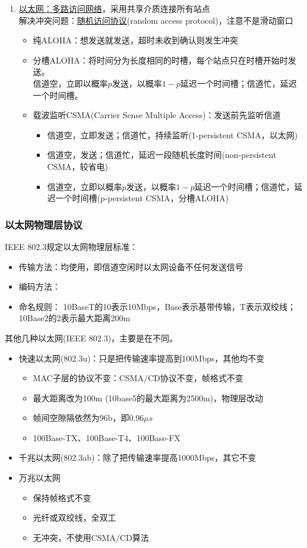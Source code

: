 \begin{enumerate}
\item \underline{以太网：多路访问网络}，采用共享介质连接所有站点\\
解决冲突问题：\underline{随机访问协议}(random access protocol)，注意不是滑动窗口
\begin{itemize}
\item 纯ALOHA：想发送就发送，超时未收到确认则发生冲突
\item 分槽ALOHA：将时间分为长度相同的时槽，每个站点只在时槽开始时发送。\\
信道空，立即以概率$p$发送，以概率$1-p$延迟一个时间槽；信道忙，延迟一个时间槽。
\item 载波监听CSMA(Carrier Sense Multiple Access)：发送前先监听信道
\begin{itemize}
	\item 信道空，立即发送；信道忙，持续监听(1-persistent CSMA，以太网)
	\item 信道空，发送；信道忙，延迟一段随机长度时间(non-persistent CSMA，较省电)
	\item 信道空，立即以概率$p$发送，以概率$1-p$延迟一个时间槽；信道忙，延迟一个时间槽(p-persistent CSMA，分槽ALOHA)
\end{itemize}
\end{itemize}
\end{enumerate}

\subsubsection{以太网物理层协议}
IEEE 802.3规定以太网物理层标准：
\begin{itemize}
	\item 传输方法：均使用，即信道空闲时以太网设备不任何发送信号
	\item 编码方法：
	\item 命名规则： 10BaseT的10表示10Mbps，Base表示基带传输，T表示双绞线；10Base2的2表示最大距离200m
\end{itemize}

\myhline
其他几种以太网(IEEE 802.3)，主要是在不同。
\begin{itemize}
\item 快速以太网(802.3u)：只是把传输速率提高到100Mbps，其他均不变
\begin{itemize}
	\item MAC子层的协议不变：CSMA/CD协议不变，帧格式不变
	\item 最大距离改为100m (10base5的最大距离为2500m)，物理层改动
	\item 帧间空隙隔依然为96b，即$0.96\mu s$
	\item 100Base-TX、100Base-T4、100Base-FX
\end{itemize}
\item 千兆以太网(802.3ab)：除了把传输速率提高1000Mbps，其它不变
\item 万兆以太网
\begin{itemize}
	\item 保持帧格式不变
	\item 光纤或双绞线，全双工
	\item 无冲突，不使用CSMA/CD算法
\end{itemize}
\end{itemize}

